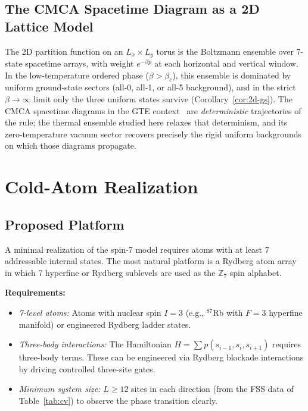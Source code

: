 \documentclass[11pt]{article}
\theoremstyle{remark}
\begin{document}
\subsection{The CMCA Spacetime Diagram as a 2D Lattice Model}

The 2D partition function on an $L_x \times L_y$ torus is the Boltzmann
ensemble over 7-state spacetime arrays, with weight $e^{-\beta p}$ at each
horizontal and vertical window. In the low-temperature ordered phase
($\beta > \beta_c$), this ensemble is dominated by uniform ground-state
sectors (all-0, all-1, or all-5 background), and in the strict
$\beta \to \infty$ limit only the three uniform states survive
(Corollary~\ref{cor:2d-gs}). The CMCA spacetime diagrams in the GTE
context~\cite{SpivackCMCA} are \emph{deterministic} trajectories of the rule;
the thermal ensemble studied here relaxes that determinism, and its
zero-temperature vacuum sector recovers precisely the rigid uniform
backgrounds on which those diagrams propagate.

\section{Cold-Atom Realization}
\label{sec:cold-atom}

\subsection{Proposed Platform}

A minimal realization of the spin-7 model requires atoms with at least 7 addressable
internal states. The most natural platform is a Rydberg atom array in which 7 hyperfine or Rydberg
sublevels are used as the $\mathbb{Z}_7$ spin alphabet.

\noindent\textbf{Requirements:}
\begin{itemize}[leftmargin=2em,itemsep=2pt]
  \item \emph{7-level atoms:} Atoms with nuclear spin $I = 3$ (e.g., $^{87}$Rb with
    $F = 3$ hyperfine manifold) or engineered Rydberg ladder states.
  \item \emph{Three-body interactions:} The Hamiltonian $H = \sum p(s_{i-1},s_i,s_{i+1})$
    requires three-body terms. These can be engineered via Rydberg blockade
    interactions by driving controlled three-site gates.
  \item \emph{Minimum system size:} $L \geq 12$ sites in each direction (from the
    FSS data of Table~\ref{tab:cv}) to observe the phase transition clearly.
\end{itemize}
\end{document}
